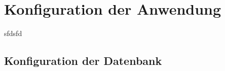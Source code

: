 
\thispagestyle{plain}

\chapter{Konfiguration der Anwendung}\label{c_config}
sfdsfd
\section{Konfiguration der Datenbank}\label{s_config_db}